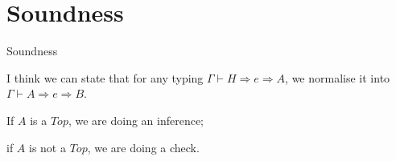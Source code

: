 \section{Soundness}

\begin{frame}{Soundness}

I think we can state that for any typing $\Gamma \vdash H \Rightarrow e \Rightarrow A$, we normalise it into $\Gamma \vdash A \Rightarrow e \Rightarrow B$. 

If $A$ is a $Top$, we are doing an inference; 

if $A$ is not a $Top$, we are doing a check.
	
\end{frame}